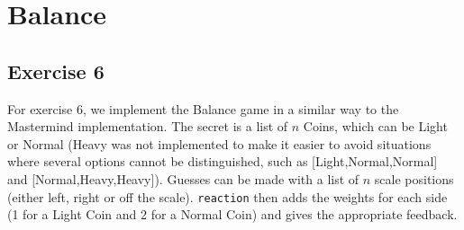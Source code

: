 \section*{Balance}

\subsection*{Exercise 6}
For exercise 6, we implement the Balance game in a similar way to the Mastermind implementation. The secret is a list of $n$ Coins, which can be Light or Normal (Heavy was not implemented to make it easier to avoid situations where several options cannot be distinguished, such as [Light,Normal,Normal] and [Normal,Heavy,Heavy]). Guesses can be made with a list of $n$ scale positions (either left, right or off the scale). \texttt{reaction} then adds the weights for each side (1 for a Light Coin and 2 for a Normal Coin) and gives the appropriate feedback.

